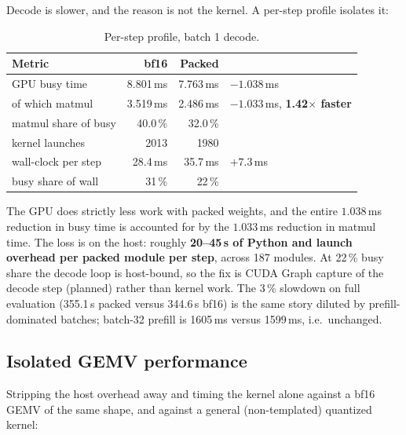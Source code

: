 \documentclass[11pt]{article}
\newcommand{\x}{$\times$}
\newcommand{\pct}{\,\%}
\begin{document}
Decode is slower, and the reason is not the kernel. A per-step profile isolates it:

\begin{table}[H]
\centering\small
\caption{Per-step profile, batch 1 decode.}
\begin{tabular}{lrrl}
\toprule
Metric & bf16 & Packed & \\
\midrule
GPU busy time & 8.801\,ms & 7.763\,ms & $-1.038$\,ms \\
\rowcolor{rowtint}
\quad of which matmul & 3.519\,ms & 2.486\,ms & $-1.033$\,ms, \textbf{1.42\x{} faster} \\
matmul share of busy & 40.0\pct & 32.0\pct & \\
\rowcolor{rowtint}
kernel launches & 2013 & 1980 & \\
wall-clock per step & 28.4\,ms & 35.7\,ms & $+7.3$\,ms \\
\rowcolor{rowtint}
busy share of wall & 31\pct & 22\pct & \\
\bottomrule
\end{tabular}
\end{table}

The GPU does strictly less work with packed weights, and the entire $1.038$\,ms reduction in busy
time is accounted for by the $1.033$\,ms reduction in matmul time. The loss is on the host:
roughly \textbf{20--45\,\textmu s of Python and launch overhead per packed module per step},
across 187 modules. At 22\pct{} busy share the decode loop is host-bound, so the fix is CUDA
Graph capture of the decode step (planned) rather than kernel work. The 3\pct{} slowdown on full
evaluation (355.1\,s packed versus 344.6\,s bf16) is the same story diluted by
prefill-dominated batches; batch-32 prefill is 1605\,ms versus 1599\,ms, i.e.\ unchanged.

\subsection{Isolated GEMV performance}

Stripping the host overhead away and timing the kernel alone against a bf16 GEMV of the same
shape, and against a general (non-templated) quantized kernel:
\end{document}
